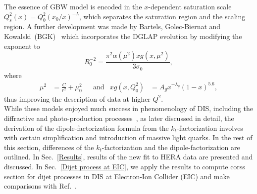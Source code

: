 \documentclass[12pt]{article}
\numberwithin{equation}{section}
\numberwithin{table}{section}
\numberwithin{figure}{section}
\begin{document}
The essence of GBW model is encoded in the $x$-dependent saturation scale $Q_s^2(x)=Q^2_0(x_0/x)^{-\lambda}$, which separates the saturation region and the scaling region.
A further development was made by Bartels, Golec-Biernat and Kowalski~(BGK)~\cite{Bartels:2002cj} which incorporates the DGLAP evolution by modifying the exponent to 
\begin{equation}
R_0^{-2}=\frac{\pi^2\alpha(\mu^2)xg(x,\mu^2)}{3\sigma_0},
\end{equation}
where
\begin{align}
\mu^2&=\frac{C}{r^2}+\mu_0^2 & &\mathrm{and} & xg(x,Q^2_0)&=A_g x^{-\lambda_g}(1-x)^{5.6},
\end{align}
thus improving the description of data at higher $Q^2$.\\
While these models enjoyed much success in phenomenology of DIS, including the diffractive and photo-production processes~\cite{Golec-Biernat:1998zce,Golec-Biernat:1999qor}, as later discussed in detail, the derivation of the dipole-factorization formula from the $k_t$-factorization involves with certain simplification and introduction of massive light quarks. 
In the rest of this section, differences of the $k_t$-factorization and the dipole-factorization are outlined.  In Sec.~\ref{Results}, results of the new fit to HERA data are presented and discussed. In Sec.~\ref{Dijet process at EIC}, we apply the results to compute corss section for dijet processes in DIS at Electron-Ion Collider (EIC) and make comparisons with Ref.~\cite{vanHameren:2021sqc}.\\
\end{document}
